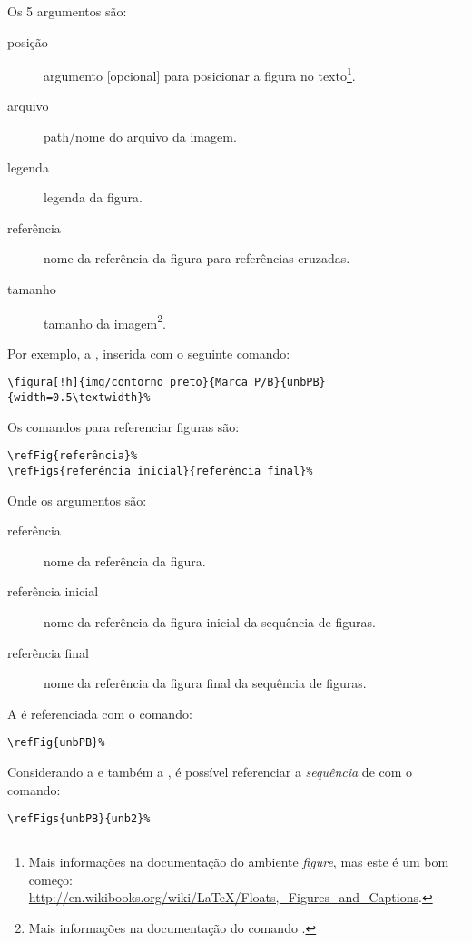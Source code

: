 Os 5 argumentos são:
\begin{description}
	\item[posição] argumento [opcional] para posicionar a figura no texto\footnote{Mais
		informações na documentação do ambiente \emph{figure}, mas este é um bom começo: 
		\url{http://en.wikibooks.org/wiki/LaTeX/Floats,_Figures_and_Captions}.}.
	\item[arquivo] path/nome do arquivo da imagem.
	\item[legenda] legenda da figura.
	\item[referência] nome da referência da figura para referências cruzadas.
	\item[tamanho] tamanho da imagem\footnote{Mais informações na documentação do comando
		.}.
\end{description}

Por exemplo, a , inserida com o seguinte comando:

\begin{verbatim}
\figura[!h]{img/contorno_preto}{Marca P/B}{unbPB}{width=0.5\textwidth}%
\end{verbatim}

%

Os comandos para referenciar figuras são:

\begin{verbatim}
\refFig{referência}%
\refFigs{referência inicial}{referência final}%
\end{verbatim}

Onde os argumentos são:
\begin{description}
	\item[referência] nome da referência da figura.
	\item[referência inicial] nome da referência da figura inicial da sequência de figuras.
	\item[referência final] nome da referência da figura final da sequência de figuras.
\end{description}

A  é referenciada com o comando:
\begin{verbatim}
\refFig{unbPB}%
\end{verbatim}

%

Considerando a  e também a , é possível referenciar
a \emph{sequência} de  com o comando:
\begin{verbatim}
\refFigs{unbPB}{unb2}%
\end{verbatim}

